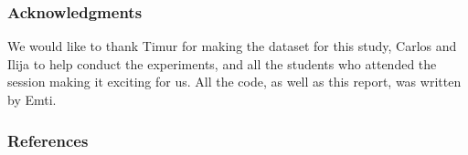 \documentclass{article} %
\begin{document}
\subsubsection*{Acknowledgments}
We would like to thank Timur for making the dataset for this study, Carlos and Ilija to help conduct the experiments, and all the students who attended the session making it exciting for us. All the code, as well as this report, was written by Emti. 

\subsubsection*{References}
\end{document}
